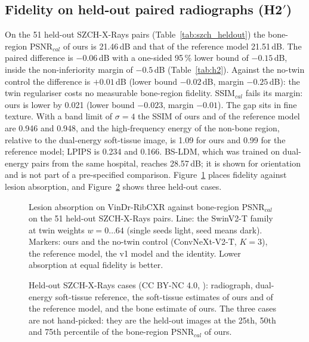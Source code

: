 \subsection{Fidelity on held-out paired radiographs (\texorpdfstring{H2$'$}{H2'})}
On the 51 held-out SZCH-X-Rays pairs (Table~\ref{tab:szch_heldout}) the bone-region PSNR$_{cal}$ of ours is 21.46\,dB and that of the
reference model 21.51\,dB. The paired difference is $-0.06$\,dB with a one-sided 95\,\% lower bound of $-0.15$\,dB, inside the
non-inferiority margin of $-0.5$\,dB (Table~\ref{tab:h2}). Against the no-twin control the difference is $+0.01$\,dB (lower bound
$-0.02$\,dB, margin $-0.25$\,dB): the twin regulariser costs no measurable bone-region fidelity. SSIM$_{cal}$ fails its margin: ours is
lower by 0.021 (lower bound $-0.023$, margin $-0.01$). The gap sits in fine texture. With a band limit of $\sigma=4$ the SSIM of ours and of
the reference model are 0.946 and 0.948, and the high-frequency energy of the non-bone region, relative to the dual-energy soft-tissue image,
is 1.09 for ours and 0.99 for the reference model; LPIPS is 0.234 and 0.166. BS-LDM, which was trained on dual-energy pairs from the same
hospital, reaches 28.57\,dB; it is shown for orientation and is not part of a pre-specified comparison. Figure~\ref{fig:pareto} places
fidelity against lesion absorption, and Figure~\ref{fig:qualitative} shows three held-out cases.
\begin{table}[htbp]
\centering\small
\caption{Held-out SZCH-X-Rays pairs: bone-region and whole-image metrics for ours and the comparators, calibrated (primary) and raw.}
\label{tab:szch_heldout}
\end{table}
\begin{table}[htbp]
\centering\small
\caption{H2$'$ non-inferiority on the 51 held-out SZCH-X-Rays pairs (paired differences, image bootstrap, one-sided 95\,\% lower bound).}
\label{tab:h2}
\end{table}
\begin{figure}[htbp]
\centering
{}
\caption{Lesion absorption on VinDr-RibCXR against bone-region PSNR$_{cal}$ on the 51 held-out SZCH-X-Rays pairs. Line: the SwinV2-T family at
twin weights $w=0\ldots64$ (single seeds light, seed means dark). Markers: ours and the no-twin control (ConvNeXt-V2-T, $K=3$), the reference
model, the v1 model and the identity. Lower absorption at equal fidelity is better.}
\label{fig:pareto}
\end{figure}
\begin{figure}[htbp]
\centering
{}
\caption{Held-out SZCH-X-Rays cases (CC BY-NC 4.0, \citealp{sun2026bsldm}): radiograph, dual-energy soft-tissue reference, the soft-tissue
estimates of ours and of the reference model, and the bone estimate of ours. The three cases are not hand-picked: they are the held-out images at
the 25th, 50th and 75th percentile of the bone-region PSNR$_{cal}$ of ours.}
\label{fig:qualitative}
\end{figure}

